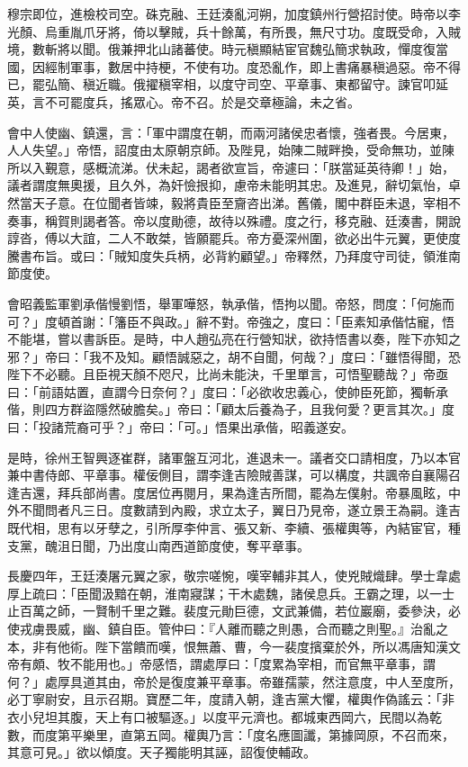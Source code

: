 \begin{pinyinscope}
 穆宗即位，進檢校司空。硃克融、王廷湊亂河朔，加度鎮州行營招討使。時帝以李光顏、烏重胤爪牙將，倚以擊賊，兵十餘萬，有所畏，無尺寸功。度既受命，入賊境，數斬將以聞。俄兼押北山諸蕃使。時元稹顯結宦官魏弘簡求執政，憚度復當國，因經制軍事，數居中持梗，不使有功。度恐亂作，即上書痛暴稹過惡。帝不得已，罷弘簡、稹近職。俄擢稹宰相，以度守司空、平章事、東都留守。諫官叩延英，言不可罷度兵，搖眾心。帝不召。於是交章極論，未之省。



 會中人使幽、鎮還，言：「軍中謂度在朝，而兩河諸侯忠者懷，強者畏。今居東，人人失望。」帝悟，詔度由太原朝京師。及陛見，始陳二賊畔換，受命無功，並陳所以入覲意，感概流涕。伏未起，謁者欲宣旨，帝遽曰：「朕當延英待卿！」始，議者謂度無奧援，且久外，為奸憸拫抑，慮帝未能明其忠。及進見，辭切氣怡，卓然當天子意。在位聞者皆竦，毅將貴臣至齎咨出涕。舊儀，閣中群臣未退，宰相不奏事，稱賀則謁者答。帝以度勛德，故待以殊禮。度之行，移克融、廷湊書，開說諄沓，傅以大誼，二人不敢桀，皆願罷兵。帝方憂深州圍，欲必出牛元翼，更使度騰書布旨。或曰：「賊知度失兵柄，必背約顧望。」帝釋然，乃拜度守司徒，領淮南節度使。



 會昭義監軍劉承偕慢劉悟，舉軍嘩怒，執承偕，悟拘以聞。帝怒，問度：「何施而可？」度頓首謝：「籓臣不與政。」辭不對。帝強之，度曰：「臣素知承偕怙寵，悟不能堪，嘗以書訴臣。是時，中人趙弘亮在行營知狀，欲持悟書以奏，陛下亦知之邪？」帝曰：「我不及知。顧悟誠惡之，胡不自聞，何哉？」度曰：「雖悟得聞，恐陛下不必聽。且臣視天顏不咫尺，比尚未能決，千里單言，可悟聖聽哉？」帝亟曰：「前語姑置，直謂今日奈何？」度曰：「必欲收忠義心，使帥臣死節，獨斬承偕，則四方群盜隱然破膽矣。」帝曰：「顧太后養為子，且我何愛？更言其次。」度曰：「投諸荒裔可乎？」帝曰：「可。」悟果出承偕，昭義遂安。



 是時，徐州王智興逐崔群，諸軍盤互河北，進退未一。議者交口請相度，乃以本官兼中書侍郎、平章事。權佞側目，謂李逢吉險賊善謀，可以構度，共諷帝自襄陽召逢吉還，拜兵部尚書。度居位再閱月，果為逢吉所間，罷為左僕射。帝暴風眩，中外不聞問者凡三日。度數請到內殿，求立太子，翼日乃見帝，遂立景王為嗣。逢吉既代相，思有以牙孽之，引所厚李仲言、張又新、李續、張權輿等，內結宦官，種支黨，醜沮日聞，乃出度山南西道節度使，奪平章事。



 長慶四年，王廷湊屠元翼之家，敬宗嗟惋，嘆宰輔非其人，使兇賊熾肆。學士韋處厚上疏曰：「臣聞汲黯在朝，淮南寢謀；干木處魏，諸侯息兵。王霸之理，以一士止百萬之師，一賢制千里之難。裴度元勛巨德，文武兼備，若位巖廟，委參決，必使戎虜畏威，幽、鎮自臣。管仲曰：『人離而聽之則愚，合而聽之則聖。』治亂之本，非有他術。陛下當饋而嘆，恨無蕭、曹，今一裴度擯棄於外，所以馮唐知漢文帝有頗、牧不能用也。」帝感悟，謂處厚曰：「度累為宰相，而官無平章事，謂何？」處厚具道其由，帝於是復度兼平章事。帝雖孺蒙，然注意度，中人至度所，必丁寧尉安，且示召期。寶歷二年，度請入朝，逢吉黨大懼，權輿作偽謠云：「非衣小兒坦其腹，天上有口被驅逐。」以度平元濟也。都城東西岡六，民間以為乾數，而度第平樂里，直第五岡。權輿乃言：「度名應圖讖，第據岡原，不召而來，其意可見。」欲以傾度。天子獨能明其誣，詔復使輔政。




\end{pinyinscope}
